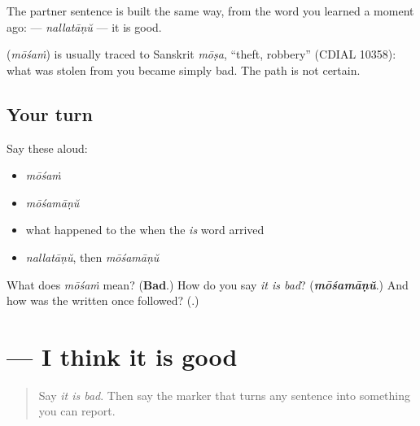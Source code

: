 The partner sentence is built the same way, from the word you learned a moment ago: \textbf{} — \emph{nallatāṇŭ} — it is good.

\begin{cousinweb}
\textbf{} (\emph{mōśaṁ}) is usually traced to Sanskrit \emph{mōṣa}, \textquotedblleft{}theft, robbery\textquotedblright{} (CDIAL 10358): what was stolen from you became simply bad. The path is not certain.
\end{cousinweb}

\subsection*{Your turn}
Say these aloud:

\begin{itemize}
\raggedright
  \item \emph{mōśaṁ}
  \item \emph{mōśamāṇŭ}
  \item what happened to the \textbf{} when the \emph{is} word arrived
  \item \emph{nallatāṇŭ}, then \emph{mōśamāṇŭ}
\end{itemize}

\begin{tcolorbox}[breakable,colback=teal!4,colframe=teal!35!black,title={Before you move on}]
What does \emph{mōśaṁ} mean? (\textbf{Bad}.) How do you say \emph{it is bad}? (\emph{\textbf{mōśamāṇŭ}}.) And how was the \textbf{} written once \textbf{} followed? (\textbf{}.)
\end{tcolorbox}
\section[\texorpdfstring{\ml{നല്ലതാണ്} \ml{എന്ന്} \ml{ഞാൻ} … (nallatāṇŭ ennŭ …)}{നല്ലതാണ് എന്ന് ഞാൻ … (nallatāṇŭ ennŭ …)}]{    — I think it is good}

\label{lesson:ML-C89-opinion}



\begin{quote}
Say \emph{it is bad}. Then say the marker that turns any sentence into something you can report.
\end{quote}

